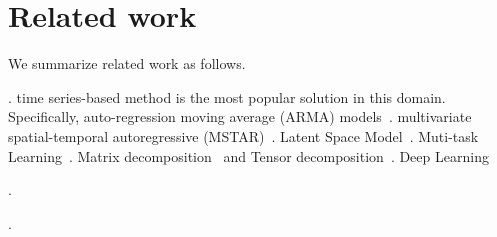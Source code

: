 \section{Related work}
\label{sec-related}

We summarize related work as follows.

. 
time series-based method is the most popular solution in this domain. Specifically, auto-regression moving average (ARMA) models~\cite{TS2012ICDM}.
multivariate spatial-temporal autoregressive (MSTAR)~\cite{traffic2011TRP}.
Latent Space Model~\cite{LSM2016KDD}.
Muti-task Learning~\cite{MTL2017ICDM}.
Matrix decomposition~\cite{Zhu2013TMC,Shang2014KDD} and Tensor decomposition~\cite{Wang2014KDD}.
Deep Learning~\cite{DL2016ICDM,DL2017SDM,DL2017CoRR}

.

. 





